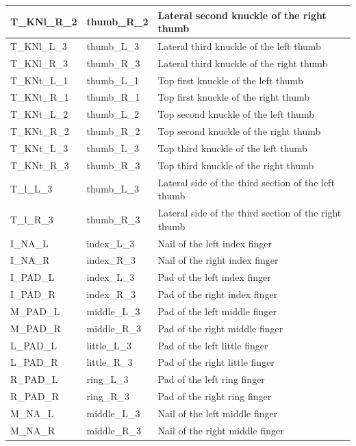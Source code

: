 \documentclass[../main.tex]{subfiles}
\begin{document}
\begin{longtable}{|p{2cm}|p{3cm}|p{5cm}|}
    T\_KNl\_R\_2 & thumb\_R\_2 & Lateral second knuckle of the right thumb \\ \hline
    T\_KNl\_L\_3 & thumb\_L\_3 & Lateral third knuckle of the left thumb \\ \hline
    T\_KNl\_R\_3 & thumb\_R\_3 & Lateral third knuckle of the right thumb \\ \hline
    T\_KNt\_L\_1 & thumb\_L\_1 & Top first knuckle of the left thumb \\ \hline
    T\_KNt\_R\_1 & thumb\_R\_1 & Top first knuckle of the right thumb \\ \hline
    T\_KNt\_L\_2 & thumb\_L\_2 & Top second knuckle of the left thumb \\ \hline
    T\_KNt\_R\_2 & thumb\_R\_2 & Top second knuckle of the right thumb \\ \hline
    T\_KNt\_L\_3 & thumb\_L\_3 & Top third knuckle of the left thumb \\ \hline
    T\_KNt\_R\_3 & thumb\_R\_3 & Top third knuckle of the right thumb \\ \hline
    T\_l\_L\_3 & thumb\_L\_3 & Lateral side of the third section of the left thumb \\ \hline
    T\_l\_R\_3 & thumb\_R\_3 & Lateral side of the third section of the right thumb \\ \hline
    I\_NA\_L & index\_L\_3 & Nail of the left index finger \\ \hline
    I\_NA\_R & index\_R\_3 & Nail of the right index finger \\ \hline
    I\_PAD\_L & index\_L\_3 & Pad of the left index finger \\ \hline
    I\_PAD\_R & index\_R\_3 & Pad of the right index finger \\ \hline
    M\_PAD\_L & middle\_L\_3 & Pad of the left middle finger \\ \hline
    M\_PAD\_R & middle\_R\_3 & Pad of the right middle finger \\ \hline
    L\_PAD\_L & little\_L\_3 & Pad of the left little finger \\ \hline
    L\_PAD\_R & little\_R\_3 & Pad of the right little finger \\ \hline
    R\_PAD\_L & ring\_L\_3 & Pad of the left ring finger \\ \hline
    R\_PAD\_R & ring\_R\_3 & Pad of the right ring finger \\ \hline
    M\_NA\_L & middle\_L\_3 & Nail of the left middle finger \\ \hline
    M\_NA\_R & middle\_R\_3 & Nail of the right middle finger \\ \hline

\end{longtable}
\end{document}
